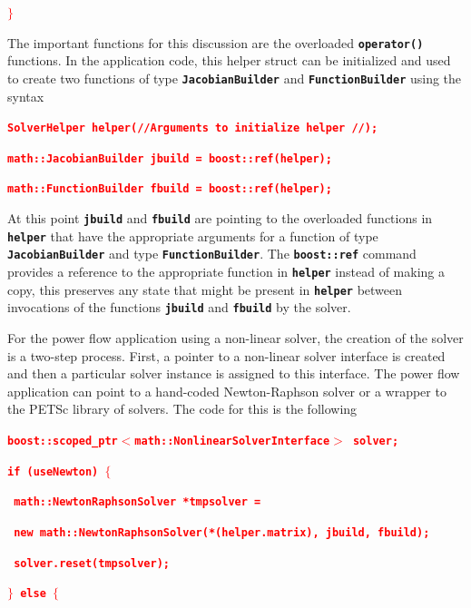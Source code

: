 \documentclass[12pt]{report} %
\begin{document}
\textcolor{red}{\texttt{\textbf{$\boldsymbol{\mathrm{\}}}$}}}

The important functions for this discussion are the overloaded \texttt{\textbf{operator()}} functions. In the application code, this helper struct can be initialized and used to create two functions of type \texttt{\textbf{JacobianBuilder}} and \texttt{\textbf{FunctionBuilder}} using the syntax

\textcolor{red}{\texttt{\textbf{SolverHelper helper(//Arguments to initialize helper //);}}}

\textcolor{red}{\texttt{\textbf{math::JacobianBuilder jbuild = boost::ref(helper);}}}

\textcolor{red}{\texttt{\textbf{math::FunctionBuilder fbuild = boost::ref(helper);}}}

At this point \texttt{\textbf{jbuild}} and \texttt{\textbf{fbuild}} are pointing to the overloaded functions in \texttt{\textbf{helper}} that have the appropriate arguments for a function of type \texttt{\textbf{JacobianBuilder}} and type \texttt{\textbf{FunctionBuilder}}. The \texttt{\textbf{boost::ref}} command provides a reference to the appropriate function in \texttt{\textbf{helper}} instead of making a copy, this preserves any state that might be present in \texttt{\textbf{helper}} between invocations of the functions \texttt{\textbf{jbuild}} and \texttt{\textbf{fbuild}} by the solver.

For the power flow application using a non-linear solver, the creation of the solver is a two-step process. First, a pointer to a non-linear solver interface is created and then a particular solver instance is assigned to this interface. The power flow application can point to a hand-coded Newton-Raphson solver or a wrapper to the PETSc library of solvers. The code for this is the following

\textcolor{red}{\texttt{\textbf{boost::scoped\_ptr$\boldsymbol{\mathrm{<}}$math::NonlinearSolverInterface$\boldsymbol{\mathrm{>}}$ solver;}}}

\textcolor{red}{\texttt{\textbf{if (useNewton) $\boldsymbol{\mathrm{\{}}$}}}

\textcolor{red}{\texttt{\textbf{  math::NewtonRaphsonSolver *tmpsolver =}}}

\textcolor{red}{\texttt{\textbf{    new math::NewtonRaphsonSolver(*(helper.matrix), jbuild, fbuild);}}}

\textcolor{red}{\texttt{\textbf{  solver.reset(tmpsolver);}}}

\textcolor{red}{\texttt{\textbf{$\boldsymbol{\mathrm{\}}}$ else $\boldsymbol{\mathrm{\{}}$}}}
\end{document}
